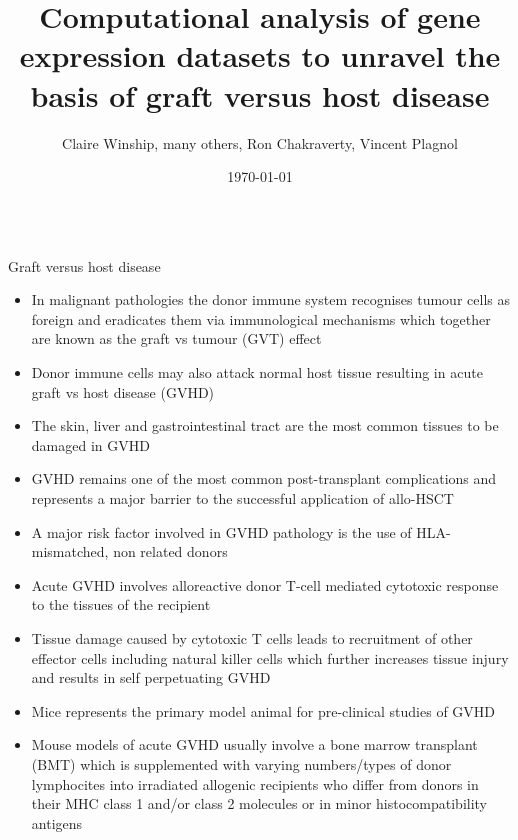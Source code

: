 \documentclass[final,hyperref={pdfpagelabels=false}]{beamer}
\title[GVHD]{Computational analysis of gene expression datasets to unravel the basis of graft versus host disease}
\author[Winship \& Plagnol]{Claire Winship, many others, Ron Chakraverty, Vincent Plagnol}
\institute[UGI]{UCL Genetics Institute}
\date{\today}
\begin{document}
  \begin{frame}{} 

  \begin{beamercolorbox}{}
    \maketitle
  \end{beamercolorbox}


    \vfill
    \begin{columns}[t]

      \begin{column}{.25\linewidth}
        \begin{block}{Graft versus host disease}
     \begin{itemize}
          \item In malignant pathologies the donor immune system recognises tumour cells as foreign and eradicates them via immunological mechanisms which together are known as the graft vs tumour (GVT) effect
          \item Donor immune cells may also attack normal host tissue resulting in acute graft vs host disease (GVHD)
          \item The skin, liver and gastrointestinal tract are the most common tissues to be damaged in GVHD
          \item GVHD remains one of the most common post-transplant complications and represents a major barrier to the successful application of allo-HSCT
	  \item A major risk factor involved in GVHD pathology is the use of HLA-mismatched, non related donors
          \item Acute GVHD involves alloreactive donor T-cell mediated cytotoxic response to the tissues of the recipient
          \item Tissue damage caused by cytotoxic T cells leads to recruitment of other effector cells including natural killer cells which further increases tissue injury and results in self perpetuating GVHD
          \item Mice represents the primary model animal for pre-clinical studies of GVHD
          \item Mouse models of acute GVHD usually involve a bone marrow transplant (BMT) which is supplemented with varying numbers/types of donor lymphocites into irradiated allogenic recipients who differ from donors in their MHC class 1 and/or class 2 molecules or in minor histocompatibility antigens
          \end{itemize} 
        \end{block}



\end{column}
\end{columns}
\end{frame}
\end{document}
